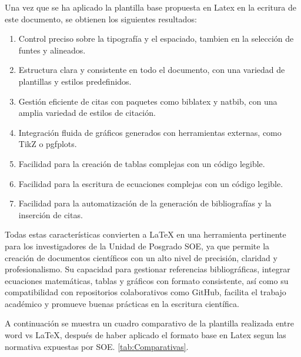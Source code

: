 \documentclass[10pt,twocolumn]{article}
\begin{document}
Una vez que se ha aplicado la plantilla base propuesta en Latex en la ecritura de este documento, se obtienen los siguientes resultados:
    \begin{enumerate}
        \item Control preciso sobre la tipografía y el espaciado, tambien en la selección de funtes y alineados.
        \item Estructura clara y consistente en todo el documento, con una variedad de plantillas y estilos predefinidos.
        \item Gestión eficiente de citas con paquetes como biblatex y natbib, con una amplia variedad de estilos de citación.
        \item Integración fluida de gráficos generados con herramientas externas, como TikZ o pgfplots.
        \item Facilidad para la creación de tablas complejas con un código legible.
        \item Facilidad para la escritura de ecuaciones complejas con un código legible.
        \item Facilidad para la automatización de la generación de bibliografías y la inserción de citas.
    \end{enumerate}
    Todas estas características convierten a LaTeX en una herramienta pertinente para los investigadores de la Unidad de Posgrado SOE, ya que permite la creación de documentos científicos con un alto nivel de precisión, claridad y profesionalismo. 
    Su capacidad para gestionar referencias bibliográficas, integrar ecuaciones matemáticas, tablas y gráficos con formato consistente, así como su compatibilidad con repositorios colaborativos como GitHub, facilita el trabajo académico y promueve buenas prácticas en la escritura científica.

    A continuación se muestra un cuadro comparativo de la plantilla realizada entre word vs LaTeX, después de haber aplicado el formato base en Latex segun las normativa expuestas por SOE.  \ref{tab:Comparativas}.
\end{document}
